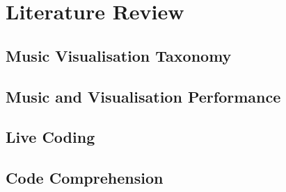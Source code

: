 
\chapter{Literature Review}
\label{cha:literaturereview}



\section{Music Visualisation Taxonomy}
\label{sec:taxonomy}



\section{Music and Visualisation Performance}
\label{sec:visualperformance}

\section{Live Coding}
\label{sec:livecoding}

\section{Code Comprehension}
\label{sec:codecomprehension}


